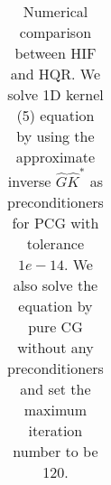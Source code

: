 \documentclass[11pt]{article}
\begin{document}
\begin{table}[!htbp]
\begin{tabular}{|c|c|c|c|c|c|c|c|c|c|c|c|c|c|c|}
\end{tabular}

\caption{Numerical comparison between HIF and HQR. We solve 1D kernel (5) equation by using the approximate inverse $\hat{G}\hat{K}^{*}$ as preconditioners for PCG with tolerance $1e-14$. We also solve the equation by pure CG without any preconditioners and set the maximum iteration number to be 120.}
\label{1d-k5}
\end{table}



 

\end{document}
